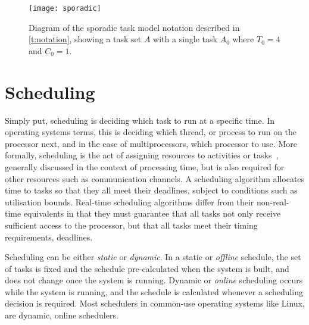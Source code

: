 \begin{figure}[t]
	\begin{center}
		\leavevmode
		\texttt{[image: sporadic]}
        \caption[Diagram of the sporadic task model.]{Diagram of the sporadic task model notation described in \cref{t:notation}, showing
        a task set $A$ with a single task $A_{0}$ where $T_{0} = 4$ and $C_{0} = 1$.}
		\label{fig:fp-schedule}
	\end{center}
\end{figure}


\section{Scheduling}
\label{sec:rt-scheduling}

Simply put, scheduling is deciding which task to run at a specific time. In operating systems terms,
this is deciding which thread, or process to run on the processor next, and in the case of
multiprocessors, which processor to use. More formally, scheduling
is the act of assigning resources to activities or tasks~\citep{Baruah_CPV_96}, generally discussed
in the context of processing time, but is also required for other resources such as communication
channels.  A scheduling algorithm allocates time to tasks so that they all meet their deadlines,
subject to conditions such as utilisation bounds.
Real-time scheduling algorithms differ from their non-real-time equivalents in that they must guarantee that
all tasks not only receive sufficient access to the processor, but that all tasks meet their timing
requirements, \ie deadlines. 

Scheduling can be either \emph{static} or \emph{dynamic}. In a static or \emph{offline} schedule, 
the set of tasks is fixed and the schedule pre-calculated when the system is built, and does not
change once the system is running. 
Dynamic or \emph{online} scheduling occurs while the system is running, and the schedule is
calculated whenever a scheduling decision is required.
Most schedulers in common-use operating systems like Linux, are dynamic, online schedulers. 

